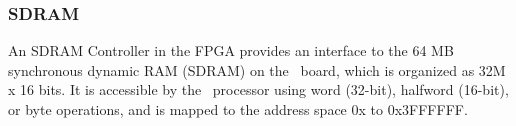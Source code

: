 \subsubsection{SDRAM}
An SDRAM Controller in the FPGA provides an interface to the 64 MB synchronous dynamic RAM (SDRAM) 
on the \DEBoard~board, which is organized as 32M {\sf x} 16 bits. It is
accessible by the \processor~processor using word (32-bit), halfword (16-bit), or byte
operations, and is mapped to the address space {\sf 0x} to {\sf 0x\baseAddressOffset 3FFFFFF}.


